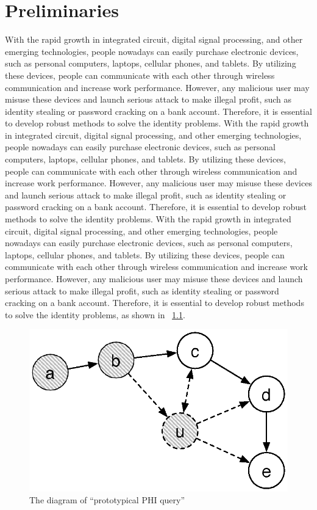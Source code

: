 \chapter{Preliminaries}
\label{sec:preliminaries}

With the rapid growth in integrated circuit, digital signal processing, and other emerging technologies, people nowadays can easily purchase electronic devices, such as personal computers, laptops, cellular phones, and tablets.  
By utilizing these devices, people can communicate with each other through wireless communication and increase work performance.      
However, any malicious user may misuse these devices and launch serious attack to make illegal profit, such as identity stealing or password cracking on a bank account.
Therefore, it is essential to develop robust methods to solve the identity problems.
With the rapid growth in integrated circuit, digital signal processing, and other emerging technologies, people nowadays can easily purchase electronic devices, such as personal computers, laptops, cellular phones, and tablets.  
By utilizing these devices, people can communicate with each other through wireless communication and increase work performance.      
However, any malicious user may misuse these devices and launch serious attack to make illegal profit, such as identity stealing or password cracking on a bank account.
Therefore, it is essential to develop robust methods to solve the identity problems.
With the rapid growth in integrated circuit, digital signal processing, and other emerging technologies, people nowadays can easily purchase electronic devices, such as personal computers, laptops, cellular phones, and tablets.  
By utilizing these devices, people can communicate with each other through wireless communication and increase work performance.      
However, any malicious user may misuse these devices and launch serious attack to make illegal profit, such as identity stealing or password cracking on a bank account.
Therefore, it is essential to develop robust methods to solve the identity problems, as shown in
~\ref{fig:PHI}.

\begin{figure}[t!]
  \begin{center}
    \includegraphics[width=1.0\textwidth]{figures/dyna_rm.eps}
    \caption{The diagram of ``prototypical PHI query''} 
    \label{fig:PHI}
  \end{center}
\end{figure}